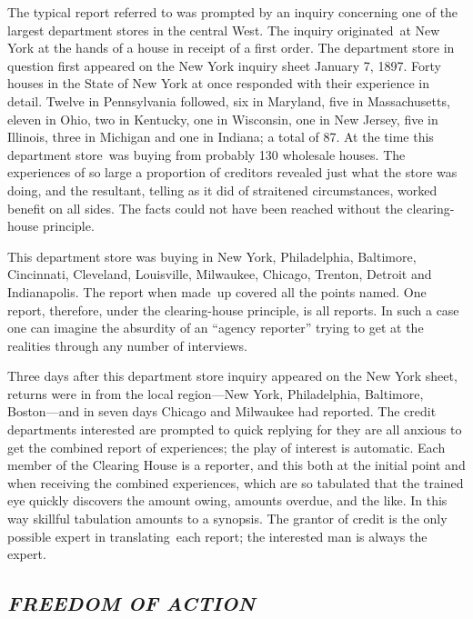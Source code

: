 \documentclass[twoside,symmetric,nobib,justified]{tufte-book}
\begin{document}
The typical report referred to was prompted by an inquiry concerning one
of the largest department stores in the central West. The inquiry
originated~at New York at the hands of a house in receipt of a first
order. The department store in question first appeared on the New York
inquiry sheet January 7, 1897. Forty houses in the State of New York at
once responded with their experience in detail. Twelve in Pennsylvania
followed, six in Maryland, five in Massachusetts, eleven in Ohio, two in
Kentucky, one in Wisconsin, one in New Jersey, five in Illinois, three
in Michigan and one in Indiana; a total of 87. At the time this
department store~was buying from probably 130 wholesale houses. The
experiences of so large a proportion of creditors revealed just what the
store was doing, and the resultant, telling as it did of straitened
circumstances, worked benefit on all sides. The facts could not have
been reached without the clearing-house principle.~

This department store was buying in New York, Philadelphia, Baltimore,
Cincinnati, Cleveland, Louisville, Milwaukee, Chicago, Trenton, Detroit
and Indianapolis. The report when made~up covered all the points named.
One report, therefore, under the clearing-house principle, is all
reports. In such a case one can imagine the absurdity of an ``agency
reporter'' trying to get at the realities through any number of
interviews.~

Three days after this department store inquiry appeared on the New York
sheet, returns were in from the local region---New York, Philadelphia,
Baltimore, Boston---and in seven days Chicago and Milwaukee had
reported. The credit departments interested are prompted to quick
replying for they are all anxious to get the combined report of
experiences; the play of interest is automatic. Each member of the
Clearing House is a reporter, and this both at the initial point and
when receiving the combined experiences, which are so tabulated that the
trained eye quickly discovers the amount owing, amounts overdue, and the
like. In this way skillful tabulation amounts to a synopsis. The grantor
of credit is the only possible expert in translating~each report; the
interested man is always the expert.~~

\hypertarget{freedom-of-action}{%
\subsection{\texorpdfstring{\emph{FREEDOM OF
ACTION}}{FREEDOM OF ACTION}}\label{freedom-of-action}}
\end{document}
